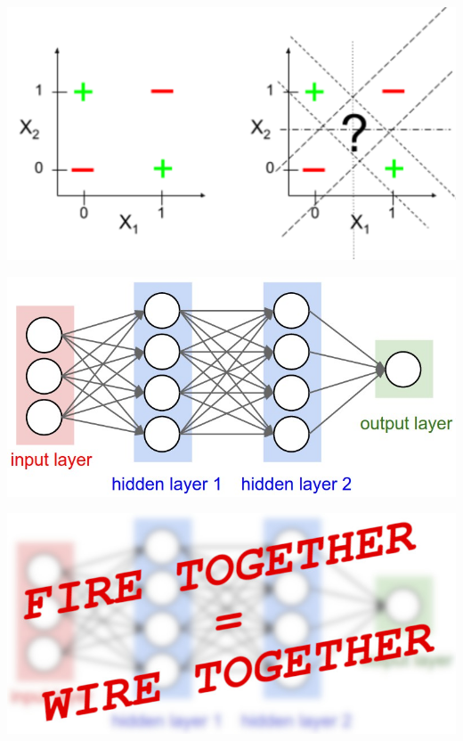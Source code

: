 \documentclass[aspectratio=43,x11names]{beamer}
\begin{document}
\begin{frame}
\begin{center}
\includegraphics[width=\textwidth]{images/xor} 
\end{center}
\end{frame}

\begin{frame}
\begin{center}
\includegraphics[width=\textwidth]{images/simple_neural_network_header.jpg} 
\end{center}
\end{frame}

\begin{frame}
\begin{center}
\includegraphics[width=\textwidth]{images/simple_neural_network_header_FW.jpg} 
\end{center}
\end{frame}
\end{document}
